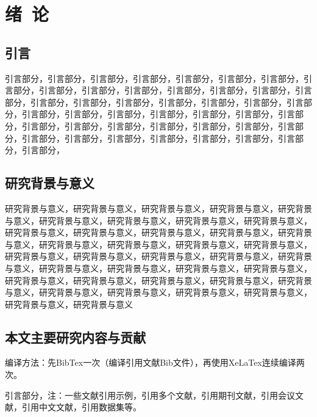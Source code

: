 \documentclass[unicode,pdfcover]{hquthesis}
\begin{document}
\tableofcontents{}%



\mainmatter

\chapter{绪\ 论}

\section{引言}
引言部分，引言部分，引言部分，引言部分，引言部分，引言部分，引言部分，引言部分，引言部分，引言部分，引言部分，引言部分，引言部分，引言部分，引言部分，引言部分，引言部分，引言部分，引言部分，引言部分，引言部分，引言部分，引言部分，引言部分，引言部分，引言部分，引言部分，引言部分，引言部分，引言部分，引言部分，引言部分，引言部分，引言部分，引言部分，引言部分，引言部分，引言部分，引言部分，引言部分，引言部分，引言部分，引言部分，引言部分，

\section{研究背景与意义}
研究背景与意义，研究背景与意义，研究背景与意义，研究背景与意义，研究背景与意义，研究背景与意义，研究背景与意义，研究背景与意义，研究背景与意义，研究背景与意义，研究背景与意义，研究背景与意义，研究背景与意义，研究背景与意义，研究背景与意义，研究背景与意义，研究背景与意义，研究背景与意义，研究背景与意义，研究背景与意义，研究背景与意义，研究背景与意义，研究背景与意义，研究背景与意义，研究背景与意义，研究背景与意义，研究背景与意义，研究背景与意义，研究背景与意义，研究背景与意义，研究背景与意义，研究背景与意义，研究背景与意义，研究背景与意义，研究背景与意义，研究背景与意义，研究背景与意义，研究背景与意义


\section{本文主要研究内容与贡献}
编译方法：先BibTex一次（编译引用文献Bib文件），再使用XeLaTex连续编译两次。

引言部分，注：一些文献引用示例，引用多个文献\cite{1-1}\cite{1-2}\cite{1-3}，引用期刊文献\cite{1-1}，引用会议文献\cite{2-3}，引用中文文献\cite{1-11}，引用数据集\cite{0-23}等。
\end{document}
